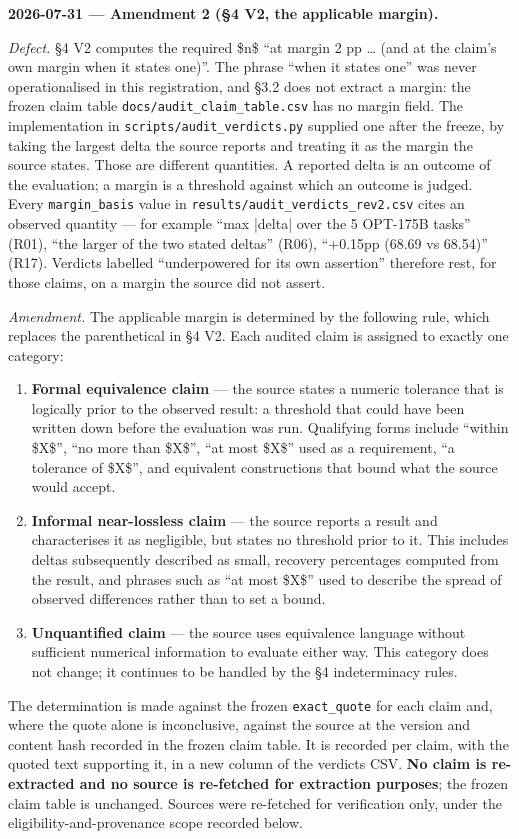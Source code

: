 \textbf{2026-07-31 --- Amendment 2 (\S{}4 V2, the applicable margin).}

\emph{Defect.} \S{}4 V2 computes the required \$n\$ ``at margin 2 pp \dots{} (and at the claim's own margin when it states one)''. The phrase ``when it states one'' was never operationalised in this registration, and \S{}3.2 does not extract a margin: the frozen claim table \texttt{docs/\allowbreak{}audit\_claim\_table.csv} has no margin field. The implementation in \texttt{scripts/\allowbreak{}audit\_verdicts.py} supplied one after the freeze, by taking the largest delta the source reports and treating it as the margin the source states. Those are different quantities. A reported delta is an outcome of the evaluation; a margin is a threshold against which an outcome is judged. Every \texttt{margin\_basis} value in \texttt{results/\allowbreak{}audit\_verdicts\_rev2.csv} cites an observed quantity --- for example ``max |delta| over the 5 OPT-175B tasks'' (R01), ``the larger of the two stated deltas'' (R06), ``+0.15pp (68.69 vs 68.54)'' (R17). Verdicts labelled ``underpowered for its own assertion'' therefore rest, for those claims, on a margin the source did not assert.

\emph{Amendment.} The applicable margin is determined by the following rule, which replaces the parenthetical in \S{}4 V2. Each audited claim is assigned to exactly one category:

\begin{enumerate}
\item \textbf{Formal equivalence claim} --- the source states a numeric tolerance that is logically prior to the observed result: a threshold that could have been written down before the evaluation was run. Qualifying forms include ``within \$X\$'', ``no more than \$X\$'', ``at most \$X\$'' used as a requirement, ``a tolerance of \$X\$'', and equivalent constructions that bound what the source would accept.
\item \textbf{Informal near-lossless claim} --- the source reports a result and characterises it as negligible, but states no threshold prior to it. This includes deltas subsequently described as small, recovery percentages computed from the result, and phrases such as ``at most \$X\$'' used to describe the spread of observed differences rather than to set a bound.
\item \textbf{Unquantified claim} --- the source uses equivalence language without sufficient numerical information to evaluate either way. This category does not change; it continues to be handled by the \S{}4 indeterminacy rules.
\end{enumerate}
The determination is made against the frozen \texttt{exact\_quote} for each claim and, where the quote alone is inconclusive, against the source at the version and content hash recorded in the frozen claim table. It is recorded per claim, with the quoted text supporting it, in a new column of the verdicts CSV. \textbf{No claim is re-extracted and no source is re-fetched for extraction purposes}; the frozen claim table is unchanged. Sources were re-fetched for verification only, under the eligibility-and-provenance scope recorded below.

